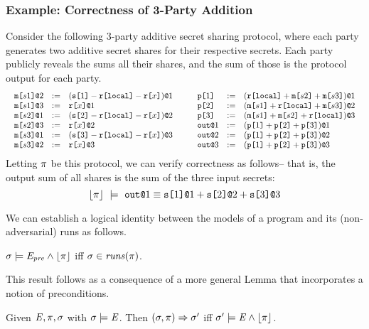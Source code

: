 \subsubsection{Example: Correctness of 3-Party Addition}
Consider the following 3-party additive secret sharing protocol, where
each party generates two additive secret shares
\cite{evans2018pragmatic} for their respective secrets. Each party
publicly reveals the sums all their shares, and the sum of those is
the protocol output for each party.  
$$
\begin{array}{c@{\qquad}c}
\begin{array}{lll}
  \elab{\mesg{s1}}{2} &:=& \elab{(\secret{1} \fminus \locflip \fminus \flip{x})}{1} \\ 
  \elab{\mesg{s1}}{3} &:=& \elab{\flip{x}}{1} \\ 
  \elab{\mesg{s2}}{1} &:=& \elab{(\secret{2} \fminus \locflip \fminus \flip{x})}{2} \\ 
  \elab{\mesg{s2}}{3} &:=& \elab{\flip{x}}{2} \\ 
  \elab{\mesg{s3}}{1} &:=& \elab{(\secret{3} \fminus \locflip \fminus \flip{x})}{3} \\ 
  \elab{\mesg{s3}}{2} &:=& \elab{\flip{x}}{3}
\end{array} & 
\begin{array}{lll}
  \rvl{1} &:=& \elab{(\locflip \fplus \mesg{s2} \fplus \mesg{s3})}{1} \\ 
  \rvl{2} &:=& \elab{(\mesg{s1} \fplus \locflip \fplus \mesg{s3})}{2} \\
  \rvl{3} &:=& \elab{(\mesg{s1} \fplus \mesg{s2} \fplus \locflip)}{3} \\
  \out{1} &:=& \elab{(\rvl{1} \fplus \rvl{2} + \rvl{3})}{1}\\
  \out{2} &:=& \elab{(\rvl{1} \fplus \rvl{2} + \rvl{3})}{2}\\
  \out{3} &:=& \elab{(\rvl{1} \fplus \rvl{2} + \rvl{3})}{3}
\end{array}
\end{array}
$$
Letting $\pi$ be this protocol, we can verify correctness
as follows-- that is, the output sum of all shares is the sum of the
three input secrets:
$$
\lfloor \pi \rfloor\ \models\ \texttt{out}\texttt{@}1 \equiv \texttt{s[}1\texttt{]}\texttt{@}1 + \texttt{s[}2\texttt{]}\texttt{@}2 + \texttt{s[}3\texttt{]}\texttt{@}3
$$

\noindent We can establish a logical identity between the models of a program and
its (non-adversarial) runs as follows.   
\begin{theorem}
  \label{theorem-toeq}
  $\sigma \models \mathit{E}_{\mathit{pre}} \wedge \lfloor \pi \rfloor$ iff $\sigma \in \mathit{runs}(\pi)$.
\end{theorem}
\noindent This result follows as a consequence of a more general Lemma
that incorporates a notion of preconditions. 
\begin{lemma}
  \label{lemma-toeq}
  Given $\mathit{E}, \pi, \sigma$ with $\sigma \models \mathit{E}$.
  Then $(\sigma,\pi) \Rightarrow \sigma'$ iff $\sigma' \models
  \mathit{E} \wedge \lfloor \pi \rfloor$.
\end{lemma}

